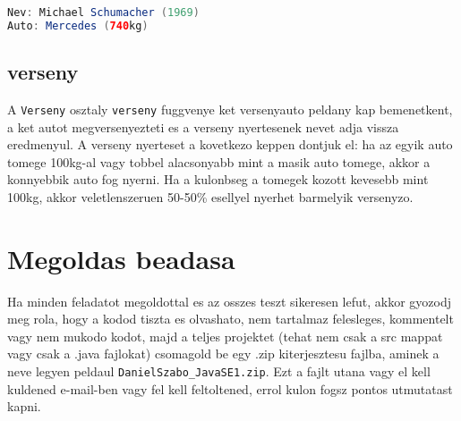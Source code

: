 \documentclass{article}
\begin{document}
\begin{lstlisting}[language=Java, caption=Pelda toString kimenet]
Nev: Michael Schumacher (1969)
Auto: Mercedes (740kg)
\end{lstlisting}

\subsection{verseny}
A \lstinline{Verseny} osztaly \lstinline{verseny} fuggvenye ket versenyauto peldany kap bemenetkent, a ket autot megversenyezteti es a verseny nyertesenek nevet adja vissza eredmenyul. A verseny nyerteset a kovetkezo keppen dontjuk el: ha az egyik auto tomege 100kg-al vagy tobbel alacsonyabb mint a masik auto tomege, akkor a konnyebbik auto fog nyerni. Ha a kulonbseg a tomegek kozott kevesebb mint 100kg, akkor veletlenszeruen 50-50\% esellyel nyerhet barmelyik versenyzo.

\section{Megoldas beadasa}
Ha minden feladatot megoldottal es az osszes teszt sikeresen lefut, akkor gyozodj meg rola, hogy a kodod tiszta es olvashato, nem tartalmaz felesleges, kommentelt vagy nem mukodo kodot, majd a teljes projektet (tehat nem csak a src mappat vagy csak a .java fajlokat) csomagold be egy .zip kiterjesztesu fajlba, aminek a neve legyen peldaul \lstinline{DanielSzabo_JavaSE1.zip}. Ezt a fajlt utana vagy el kell kuldened e-mail-ben vagy fel kell feltoltened, errol kulon fogsz pontos utmutatast kapni.
\end{document}
